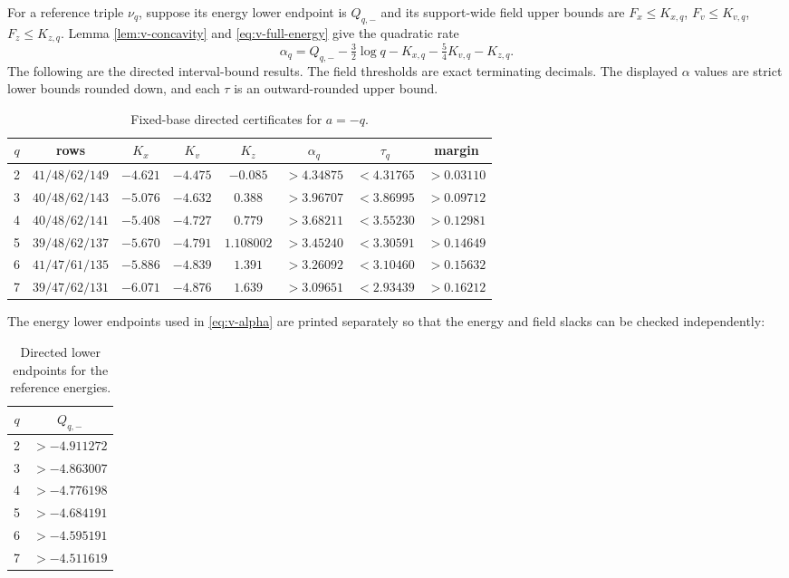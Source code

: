 For a reference triple $\nu_q$, suppose its energy lower endpoint is
$Q_{q,-}$ and its support-wide field upper bounds are
$F_x\le K_{x,q}$, $F_v\le K_{v,q}$, $F_z\le K_{z,q}$.  Lemma
\ref{lem:v-concavity} and \eqref{eq:v-full-energy} give the quadratic
rate
\begin{equation}\label{eq:v-alpha}
 \alpha_q=Q_{q,-}-\tfrac32\log q-K_{x,q}
                         -\tfrac54K_{v,q}-K_{z,q}.
\end{equation}
The following are the directed interval-bound results.  The field thresholds
are exact terminating decimals.  The displayed $\alpha$ values are strict
lower bounds rounded down, and each $\tau$ is an outward-rounded upper bound.

\begin{table}[ht]
\centering\normalsize
\renewcommand{\arraystretch}{1.12}
\caption{Fixed-base directed certificates for $a=-q$.}
\label{tab:v-certificates}
\setlength{\tabcolsep}{2pt}
\begin{tabular}{@{}c c c c c c c c@{}}
\hline
$q$&rows&$K_x$&$K_v$&$K_z$&$\alpha_q$&$\tau_q$&margin\\
\hline
2&$41/48/62/149$&$-4.621$&$-4.475$&$-0.085$&$>4.34875$&$<4.31765$\footnotemark&$>0.03110$\\
3&$40/48/62/143$&$-5.076$&$-4.632$&$0.388$&$>3.96707$&$<3.86995$&$>0.09712$\\
4&$40/48/62/141$&$-5.408$&$-4.727$&$0.779$&$>3.68211$&$<3.55230$&$>0.12981$\\
5&$39/48/62/137$&$-5.670$&$-4.791$&$1.108002$&$>3.45240$&$<3.30591$&$>0.14649$\\
6&$41/47/61/135$&$-5.886$&$-4.839$&$1.391$&$>3.26092$&$<3.10460$&$>0.15632$\\
7&$39/47/62/131$&$-6.071$&$-4.876$&$1.639$&$>3.09651$&$<2.93439$&$>0.16212$\\
\hline
\end{tabular}
\end{table}

The energy lower endpoints used in \eqref{eq:v-alpha} are printed separately
so that the energy and field slacks can be checked independently:
\begin{table}[ht]
\centering
\renewcommand{\arraystretch}{1.12}
\caption{Directed lower endpoints for the reference energies.}
\label{tab:v-energy-lower}
\begin{tabular}{@{}c c@{}}
\hline
$q$ & $Q_{q,-}$\\
\hline
2&$>-4.911272$\\
3&$>-4.863007$\\
4&$>-4.776198$\\
5&$>-4.684191$\\
6&$>-4.595191$\\
7&$>-4.511619$\\
\hline
\end{tabular}
\end{table}

